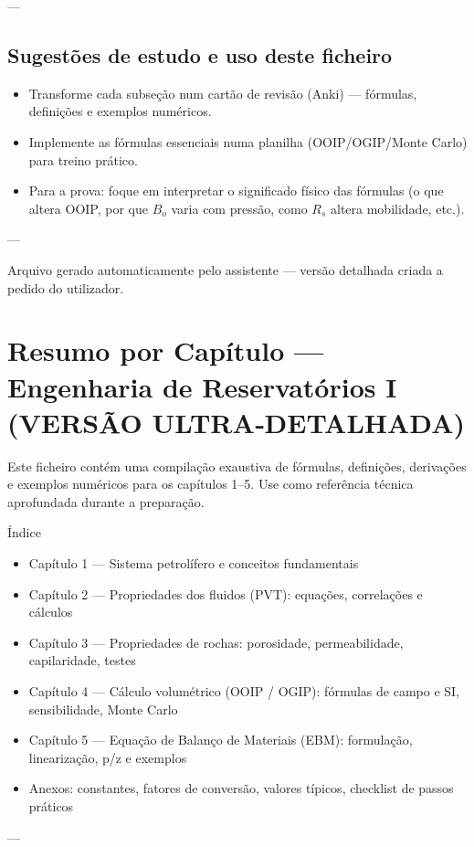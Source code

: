 \documentclass[11pt,a4paper]{article}
\begin{document}
---

\subsection{Sugestões de estudo e uso deste ficheiro}
\begin{itemize}
\item Transforme cada subseção num cartão de revisão (Anki) — fórmulas, definições e exemplos numéricos.
\item Implemente as fórmulas essenciais numa planilha (OOIP/OGIP/Monte Carlo) para treino prático.
\item Para a prova: foque em interpretar o significado físico das fórmulas (o que altera OOIP, por que $B_o$ varia com pressão, como $R_s$ altera mobilidade, etc.).
\end{itemize}

---

Arquivo gerado automaticamente pelo assistente — versão detalhada criada a pedido do utilizador.

\section{Resumo por Capítulo — Engenharia de Reservatórios I (VERSÃO ULTRA‑DETALHADA)}

Este ficheiro contém uma compilação exaustiva de fórmulas, definições, derivações e exemplos numéricos para os capítulos 1–5. Use como referência técnica aprofundada durante a preparação.

Índice
\begin{itemize}
\item Capítulo 1 — Sistema petrolífero e conceitos fundamentais
\item Capítulo 2 — Propriedades dos fluidos (PVT): equações, correlações e cálculos
\item Capítulo 3 — Propriedades de rochas: porosidade, permeabilidade, capilaridade, testes
\item Capítulo 4 — Cálculo volumétrico (OOIP / OGIP): fórmulas de campo e SI, sensibilidade, Monte Carlo
\item Capítulo 5 — Equação de Balanço de Materiais (EBM): formulação, linearização, p/z e exemplos
\item Anexos: constantes, fatores de conversão, valores típicos, checklist de passos práticos
\end{itemize}

---
\end{document}
